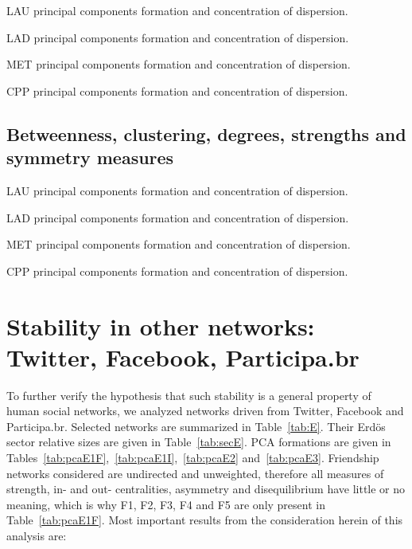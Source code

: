 \documentclass[%
 aip,
 jmp,%
 amsmath,amssymb,
 reprint,%
 floatfix,
]{revtex4-1}
\begin{document}
\begin{table}[!h]
	\caption{LAU principal components formation and concentration of dispersion.}
	\footnotesize
	
\label{tab:pcain}
\end{table}
\begin{table}[!h]
	\caption{LAD principal components formation and concentration of dispersion.}
	\footnotesize
	
\label{tab:pcain}
\end{table}
\begin{table}[!h]
	\caption{MET principal components formation and concentration of dispersion.}
	\footnotesize
	
\label{tab:pcain}
\end{table}
\begin{table}[!h]
	\caption{CPP principal components formation and concentration of dispersion.}
	\footnotesize
	
\label{tab:pcain}
\end{table}


\FloatBarrier
\subsection{Betweenness, clustering, degrees, strengths and symmetry measures}

\begin{table}[!h]
	\caption{LAU principal components formation and concentration of dispersion.}
	\footnotesize
	
\label{tab:pcain}
\end{table}
\begin{table}[!h]
	\caption{LAD principal components formation and concentration of dispersion.}
	\footnotesize
	
\label{tab:pcain}
\end{table}
\begin{table}[!h]
	\caption{MET principal components formation and concentration of dispersion.}
	\footnotesize
	
\label{tab:pcain}
\end{table}
\begin{table}[!h]
	\caption{CPP principal components formation and concentration of dispersion.}
	\footnotesize
	
\label{tab:pcain}
\end{table}

\section{Stability in other networks: Twitter, Facebook, Participa.br}\label{si:ext}
To further verify the hypothesis that such stability is a general property of human social networks,
we analyzed networks driven from Twitter, Facebook and Participa.br. Selected networks are summarized in
Table~\ref{tab:E}. Their Erd\"os sector relative sizes are given in Table~\ref{tab:secE}. PCA formations are given in
Tables~\ref{tab:pcaE1F},~\ref{tab:pcaE1I},~\ref{tab:pcaE2} and~\ref{tab:pcaE3}. Friendship networks considered are undirected and unweighted,
therefore all measures of strength, in- and out- centralities, asymmetry and disequilibrium have little or no meaning, which is why F1, F2, F3, F4 and F5 are only present in Table~\ref{tab:pcaE1F}.
Most important results from the consideration herein of this analysis are:
\end{document}
